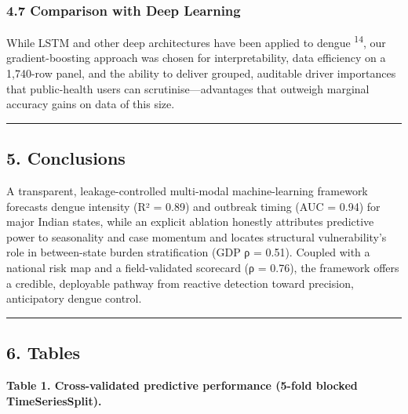 \documentclass[
  10pt,
  twocolumn]{article}
\begin{document}
\subsubsection{4.7 Comparison with Deep
Learning}\label{comparison-with-deep-learning}

While LSTM and other deep architectures have been applied to dengue
\textsuperscript{14}, our gradient-boosting approach was chosen for
interpretability, data efficiency on a 1,740-row panel, and the ability
to deliver grouped, auditable driver importances that public-health
users can scrutinise---advantages that outweigh marginal accuracy gains
on data of this size.

\begin{center}\rule{0.5\linewidth}{0.5pt}\end{center}

\subsection{5. Conclusions}\label{conclusions}

A transparent, leakage-controlled multi-modal machine-learning framework
forecasts dengue intensity (R² = 0.89) and outbreak timing (AUC = 0.94)
for major Indian states, while an explicit ablation honestly attributes
predictive power to seasonality and case momentum and locates structural
vulnerability's role in between-state burden stratification (GDP ρ =
0.51). Coupled with a national risk map and a field-validated scorecard
(ρ = 0.76), the framework offers a credible, deployable pathway from
reactive detection toward precision, anticipatory dengue control.

\begin{center}\rule{0.5\linewidth}{0.5pt}\end{center}

\subsection{6. Tables}\label{tables}

\textbf{Table 1. Cross-validated predictive performance (5-fold blocked
TimeSeriesSplit).}
\end{document}
